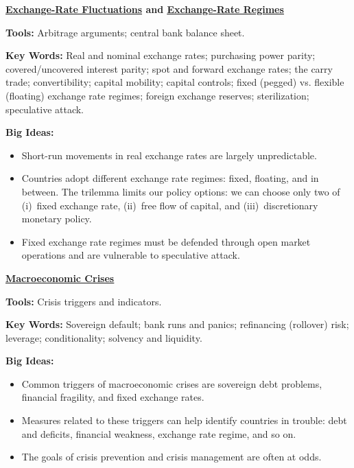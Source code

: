 \textbf{\hyperref[chp:fxf]{\underline{Exchange-Rate Fluctuations}} and \hyperref[chp:fxr]{\underline{Exchange-Rate Regimes}}}

\textbf{Tools:} Arbitrage arguments; central bank balance sheet.

\textbf{Key Words:} Real and nominal exchange rates; purchasing power parity; covered/uncovered interest parity; 
spot and forward exchange rates; the carry trade; convertibility; capital mobility; capital controls; fixed (pegged) vs. flexible (floating) exchange rate regimes; foreign exchange reserves; sterilization; speculative attack.

\textbf{Big Ideas:}
\vspace{-0.1in}
\begin{itemize}
\item Short-run movements in real exchange rates are largely unpredictable.  
\item Countries adopt different exchange rate regimes:  fixed, floating, and in between. 
The trilemma limits our policy options:  we can choose only two of
(i)~fixed exchange rate, (ii)~free flow of capital,
and (iii)~discretionary monetary policy.
\item Fixed exchange rate regimes must be defended through open market operations and are vulnerable to speculative attack.
\end{itemize}

\textbf{\hyperref[chp:cris]{\underline{Macroeconomic Crises}}}

\textbf{Tools:} Crisis triggers and indicators.

\textbf{Key Words:} Sovereign default; bank runs and panics; refinancing (rollover) risk; leverage; conditionality;
solvency and liquidity.

\textbf{Big Ideas:}
\vspace{-0.1in}
\begin{itemize}
\item Common triggers of macroeconomic crises are sovereign debt problems, financial fragility,
and fixed exchange rates.

\item Measures related to these triggers can help identify countries in trouble:
debt and deficits, financial weakness, exchange rate regime, and so on.

\item The goals of crisis prevention and crisis management are often at odds.
\end{itemize}
